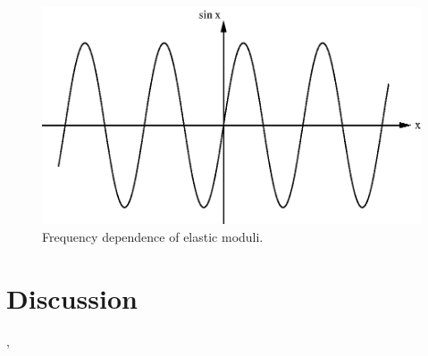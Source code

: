 \documentclass[pre,reprint]{revtex4-1}
\begin{document}
\begin{figure}[h!]
\centering
\includegraphics[scale=0.6]{sine}
\caption{\label{fig:freq}Frequency dependence of elastic moduli.}
\end{figure}









































\section{Discussion}

{\color{blue}{Finally I wax philosophical}},
{\color{green}{but}} {\color{cyan}{who is going to pay for the ink?}}
\end{document}
